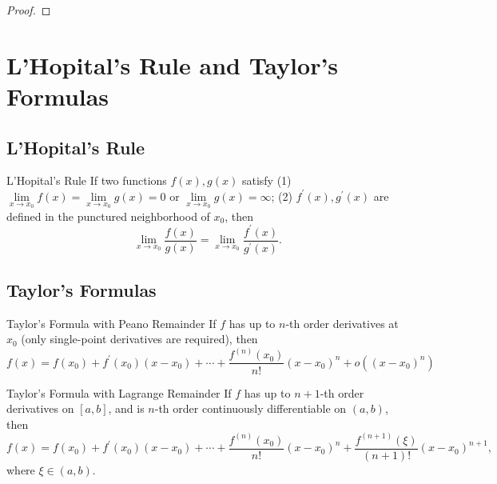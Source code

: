 \begin{proof}
  
\end{proof}

\section{L'Hopital's Rule and Taylor's Formulas}

\subsection{L'Hopital's Rule}

\begin{theorem}{L'Hopital's Rule}{}
  If two functions $f(x), g(x)$ satisfy
  (1)$\lim \limits _{x \rightarrow x_0} f(x) = \lim \limits _{x \rightarrow x_0}
  g(x) = 0$ or
  $\lim \limits _{x \rightarrow x_0} g(x) = \infty$;
  (2) $f^{\prime}(x), g^{\prime}(x)$ are defined in the punctured neighborhood
  of $x_0$, then
  \begin{equation}
    \lim \limits _{x \rightarrow x_0} \frac{f(x)}{g(x)}
    = \lim \limits _{x \rightarrow x_0} \frac{f^{\prime}(x)}{g^{\prime}(x)}.
  \end{equation}
\end{theorem}


\subsection{Taylor's Formulas}

\begin{theorem}{Taylor's Formula with Peano Remainder}{}
  If $f$ has up to $n$-th order derivatives at $x_0$ (only single-point
  derivatives are required), then
  \begin{equation}
    f(x)=f(x_0)+f^{\prime}(x_0)(x-x_0)+\cdots+\frac{f^{(n)}(x_0)}{n!}(x-x_0)^n+o((x-x_0)^n)
  \end{equation}
\end{theorem}

\begin{theorem}{Taylor's Formula with Lagrange Remainder}{}
  If $f$ has up to $n + 1$-th order derivatives on $[a, b]$,
  and is $n$-th order continuously differentiable on $(a, b)$,
  then
  \begin{equation}
    f(x)=f(x_0)+f^{\prime}(x_0)(x-x_0)+\cdots+\frac{f^{(n)}(x_0)}{n!}(x-x_0)^n+\frac{f^{(n+1)}(\xi)}{(n+1)!}(x-x_0)^{n+1},
  \end{equation}
  where $\xi \in (a, b)$.
\end{theorem}

